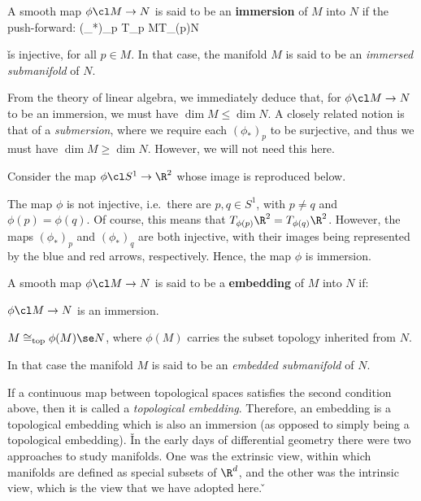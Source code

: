 \bd [Immersion]
A smooth map $\phi\cl M \to N$ is said to be an \textbf{immersion} of $M$ into $N$ if the push-forward:
\bse
(\phi_*)_p \cl T_p M\xrightarrow{\sim}T_{\phi(p)}N
\ese

\v

is injective, for all $p\in M$. In that case, the manifold $M$ is said to be an \emph{immersed submanifold} of $N$.
\ed

From the theory of linear algebra, we immediately deduce that, for $\phi\cl M\to N$ to be an immersion, we must have
$\dim M \leq \dim N$. A closely related notion is that of a \emph{submersion}, where we require each $(\phi_*)_p$ to
be surjective, and thus we must have $\dim M \geq \dim N$. However, we will not need this here.

\be
Consider the map $\phi\cl S^1\to \R^2$ whose image is reproduced below.

\vspace{10pt}

\ee

\vspace{10pt}

The map $\phi$ is not injective, i.e.\ there are $p,q\in S^1$, with $p\neq q$ and $\phi(p)=\phi(q)$. Of course, this
means that $T_{\phi(p)}\R^2=T_{\phi(q)}\R^2$. However, the maps $(\phi_*)_p$ and $(\phi_*)_q$ are both injective,
with their images being represented by the blue and red arrows, respectively. Hence, the map $\phi$ is immersion.

\bd [Embedding]
A smooth map $\phi\cl M \to N$ is said to be a \textbf{embedding} of $M$ into $N$ if:
\bit
\item $\phi\cl M\to N$ is an immersion.
\item $M \cong_{\mathrm{top}}\phi(M)\se N$, where $\phi(M)$ carries the subset topology inherited from $N$.
\eit

In that case the manifold $M$ is said to be an \emph{embedded submanifold} of $N$.
\ed

If a continuous map between topological spaces satisfies the second condition above, then it is called a
\emph{topological embedding}. Therefore, an embedding is a topological embedding which is also an immersion (as
opposed to simply being a topological embedding). \v

In the early days of differential geometry there were two approaches to study manifolds. One was the extrinsic view,
within which manifolds are defined as special subsets of $\R^d$, and the other was the intrinsic view, which is the
view that we have adopted here. \v

